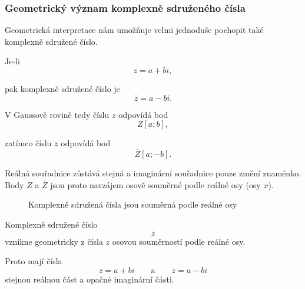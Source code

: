 \documentclass[12pt,a4paper]{article}
\begin{document}
\subsubsection*{Geometrický význam komplexně sdruženého čísla}
Geometrická interpretace nám umožňuje velmi jednoduše pochopit také komplexně sdružené číslo.

Je-li
\[
    z=a+bi,
\]

pak komplexně sdružené číslo je
\[
    \overline{z}=a-bi.
\]

V Gaussově rovině tedy číslu $z$ odpovídá bod
\[
    Z[a;b],
\]

zatímco číslu $\overline{z}$ odpovídá bod
\[
    \overline{Z}[a;-b].
\]

Reálná souřadnice zůstává stejná a imaginární souřadnice pouze změní znaménko.
Body $Z$ a $\overline{Z}$ jsou proto navzájem osově souměrné podle reálné osy (osy $x$).

\begin{figure}[ht]
    \begin{center}  
        \caption{Komplexně sdružená čísla jsou souměrná podle reálné osy}
    \end{center}
\end{figure}



\begin{notebox}
    Komplexně sdružené číslo
    \[
        \overline{z}
    \]
    vznikne geometricky z čísla $z$ osovou souměrností podle reálné osy.
    
    Proto mají čísla
    \[
        z=a+bi
        \qquad\text{a}\qquad
        \overline{z}=a-bi
    \]
    stejnou reálnou část a opačné imaginární části.
\end{notebox}
\end{document}
